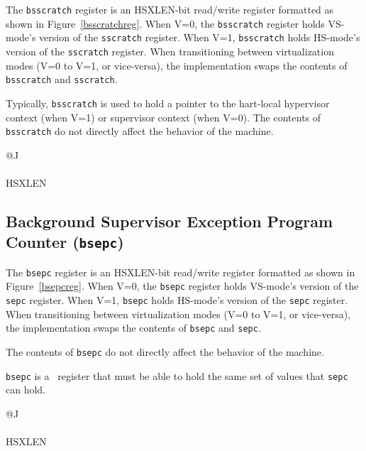 The {\tt bsscratch} register is an HSXLEN-bit read/write register formatted as shown
in Figure~\ref{bsscratchreg}.  When V=0, the {\tt bsscratch} register holds
VS-mode's version of the {\tt sscratch} register.  When V=1, {\tt bsscratch}
holds HS-mode's version of the {\tt sscratch} register.  When transitioning between
virtualization modes (V=0 to V=1, or vice-versa), the implementation swaps the
contents of {\tt bsscratch} and {\tt sscratch}.

Typically, {\tt bsscratch} is used to hold a pointer to the hart-local
hypervisor context (when V=1) or supervisor context (when V=0).  The
contents of {\tt bsscratch} do not directly affect the behavior of
the machine.

\begin{figure*}[h!]
{\footnotesize
\begin{center}
\begin{tabular}{@{}J}
 \\
\hline
{} \\
\hline
HSXLEN \\
\end{tabular}
\end{center}
}
\vspace{-0.1in}
\caption{Background supervisor scratch register ({\tt bsscratch}).}
\label{bsscratchreg}
\end{figure*}

\subsection{Background Supervisor Exception Program Counter ({\tt bsepc})}

The {\tt bsepc} register is an HSXLEN-bit read/write register formatted as shown
in Figure~\ref{bsepcreg}.  When V=0, the {\tt bsepc} register holds
VS-mode's version of the {\tt sepc} register.  When V=1, {\tt bsepc}
holds HS-mode's version of the {\tt sepc} register.  When transitioning between
virtualization modes (V=0 to V=1, or vice-versa), the implementation swaps the
contents of {\tt bsepc} and {\tt sepc}.

The contents of {\tt bsepc} do not directly affect the behavior of
the machine.

{\tt bsepc} is a \warl\ register that must be able to hold the same set of
values that {\tt sepc} can hold.

\begin{figure*}[h!]
{\footnotesize
\begin{center}
\begin{tabular}{@{}J}
 \\
\hline
{} \\
\hline
HSXLEN \\
\end{tabular}
\end{center}
}
\vspace{-0.1in}
\caption{Background supervisor exception program counter ({\tt bsepc}).}
\label{bsepcreg}
\end{figure*}

